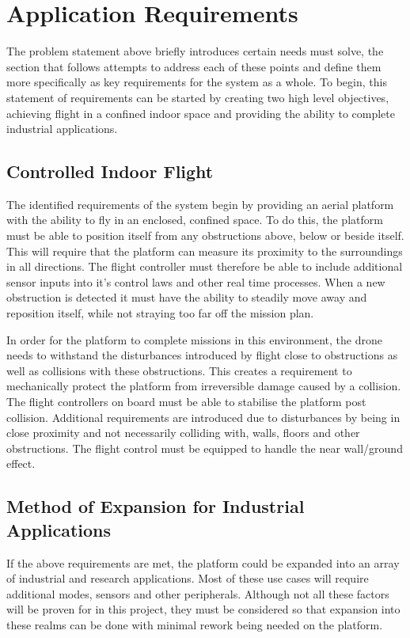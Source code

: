 	\section{Application Requirements}
	The problem statement above briefly introduces certain needs \projectName must solve, the section that follows attempts to address each of these points and define them more specifically as key requirements for the system as a whole. To begin, this statement of requirements can be started by creating two high level objectives, achieving flight in a confined indoor space and providing the ability to complete industrial applications. 
	
		\subsection{Controlled Indoor Flight}
		The identified requirements of the system begin by providing an aerial platform with the ability to fly in an enclosed, confined space. To do this, the platform must be able to position itself from any obstructions above, below or beside itself. This will require that the platform can measure its proximity to the surroundings in all directions. The flight controller must therefore be able to include additional sensor inputs into it's control laws and other real time processes. When a new obstruction is detected it must have the ability to steadily move away and reposition itself, while not straying too far off the mission plan.
		
		In order for the platform to complete missions in this environment, the drone needs to withstand the disturbances introduced by flight close to obstructions as well as collisions with these obstructions. This creates a requirement to mechanically protect the platform from irreversible damage caused by a collision. The flight controllers on board must be able to stabilise the platform post collision. Additional requirements are introduced due to disturbances by being in close proximity and not necessarily colliding with, walls, floors and other obstructions. The flight control must be equipped to handle the near wall/ground effect.
		
		\subsection{Method of Expansion for Industrial Applications}
		If the above requirements are met, the platform could be expanded into an array of industrial and research applications. Most of these use cases will require additional modes, sensors and other peripherals. Although not all these factors will be proven for in this project, they must be considered so that expansion into these realms can be done with minimal rework being needed on the platform.
		
